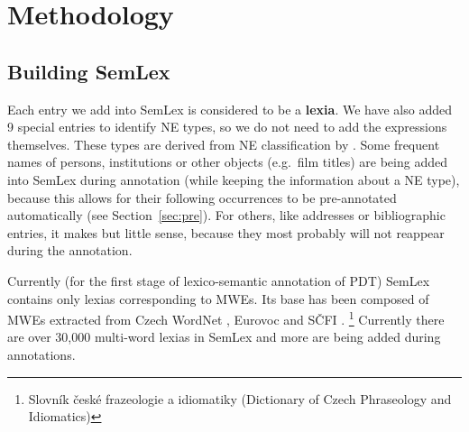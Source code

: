 \documentclass[11pt]{article}
\begin{document}
%

\section{Methodology}
\label{sec:meth}

\subsection{Building SemLex}
\label{sec:meth:semlex}
Each entry we add into SemLex is considered to be a {\bf lexia}. 
We have also added 9 special entries to identify NE types, so we do not need to add the expressions themselves.
These types are derived from NE classification by \cite{sevcikova:2007}.
%
Some frequent names of persons, institutions or other objects (e.g.~film titles) are being added into SemLex during annotation (while keeping the information about a NE type), because this allows for their following occurrences to be pre-annotated automatically (see Section~\ref{sec:pre}). For others, like addresses or bibliographic entries, it makes but little sense, because they most probably will not reappear during the annotation. 

Currently (for the first stage of lexico-semantic annotation of PDT) SemLex contains only lexias corresponding to MWEs. Its base has been composed of MWEs extracted from Czech WordNet \cite{smrz:03}, Eurovoc \cite{eurovoc:07} and SČFI \cite{cermak:1988}.%
\footnote{Slovník české frazeologie a idiomatiky (Dictionary of Czech Phraseology and Idiomatics)} 
Currently there are over 30,000 multi-word lexias in SemLex and more are being added during annotations.

\end{document}

